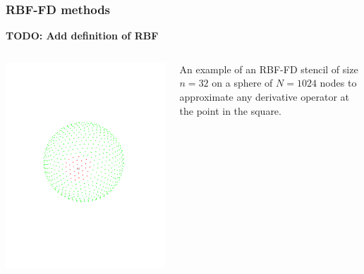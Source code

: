 \documentclass{beamer}
\newcommand{\todo}[1]{{\bf TODO: #1}}
\begin{document}
\begin{frame}
  \frametitle{RBF-FD methods}

  \todo{Add definition of RBF}
  
  \begin{columns}
    \includegraphics[width=\linewidth]{slides-figures/ICS-figures/RBFStencil_n32_a}

    An example of an RBF-FD stencil of size $n=32$ on a sphere of
    $N=1024$ nodes to approximate any derivative operator at the point
    in the square.

    

\end{columns}
\end{frame}
\end{document}
